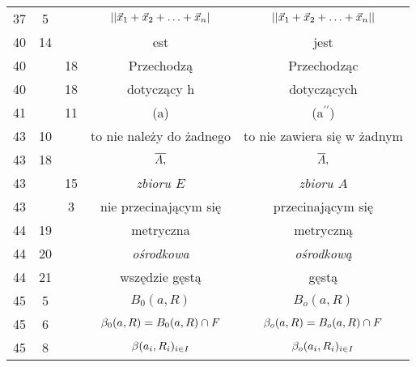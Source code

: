 \documentclass[a4paper,11pt]{article}
\begin{document}
\begin{center}
\begin{tabular}{|c|c|c|c|c|}
    37  &  5 & & $|| \vec{ x }_{ 1 } + \vec{ x }_{ 2 } + \ldots + \vec{ x }_{ n } |$
           & $|| \vec{ x }_{ 1 } + \vec{ x }_{ 2 } + \ldots + \vec{ x }_{ n } ||$
    \\
    40  & 14 & & est & jest \\
    40  & & 18 & Przechodzą & Przechodząc \\
    40  & & 18 & dotyczący h & dotyczących \\
    41  & & 11 & (a) & (a$^{ \prime \prime }$) \\
    43  & 10 & & to nie należy do żadnego & to nie zawiera się w żadnym \\
    43  & 18 & & $\overline{A,}$ & $\overline{A},$ \\
    43  & & 15 & \emph{zbioru $E$} & \emph{zbioru $A$} \\
    43  & &  3 & nie przecinającym się & przecinającym się \\
    44  & 19 & & metryczna & metryczną \\
    44  & 20 & & \emph{ośrodkowa} & \emph{ośrodkową} \\
    44  & 21 & & wszędzie gęstą & gęstą \\
    45  &  5 & & $B_{ 0 }( a, R )$ & $B_{ o }( a, R )$ \\
    45  &  6 & & $\beta_{ 0 }( a, R ) = B_{ 0 }( a, R ) \cap F$
           & $\beta_{ o }( a, R ) = B_{ o }( a, R ) \cap F$ \\
    45  &  8 & & $\beta( a_{ i }, R_{ i } )_{ i \in I}$
           & $\beta_{ o }( a_{ i }, R_{ i } )_{ i \in I}$ \\
    \hline
  \end{tabular}


\end{center}
\end{document}

